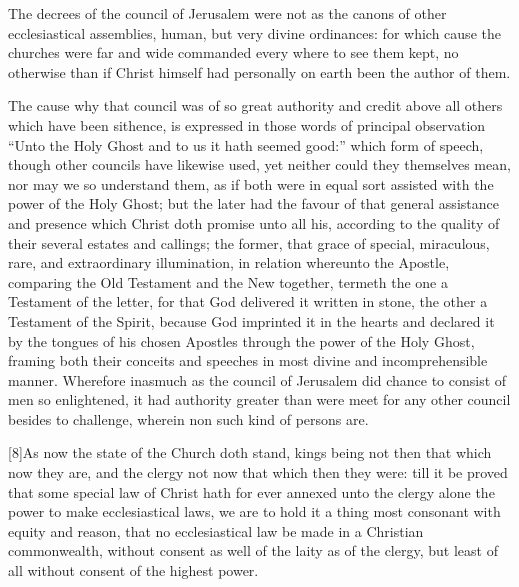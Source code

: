 The decrees of the council of Jerusalem were not as the canons of other ecclesiastical assemblies, human, but very divine ordinances: for which cause the churches were far and wide commanded every where to see them kept, no otherwise than if Christ himself had personally on earth been the author of them.

The cause why that council was of so great authority and credit above all others which have been sithence, is expressed in those words of principal observation “Unto the Holy Ghost and to us it hath seemed good:” which form of speech, though other councils have likewise used, yet neither could they themselves mean, nor may we so understand them, as if both were in equal sort assisted with the power of the Holy Ghost; but the later had the favour of that general assistance and presence which Christ doth promise unto all his, according to the quality of their several estates and callings; the former, that grace of special, miraculous, rare, and extraordinary illumination, in relation whereunto the Apostle, comparing the Old Testament and the New together, termeth the one a Testament of the letter, for that God delivered it written in stone, the other a Testament of the Spirit, because God imprinted it in the hearts and declared it by the tongues of his chosen Apostles through the power of the Holy Ghost, framing both their conceits and speeches in most divine and incomprehensible manner. Wherefore inasmuch as the council  of Jerusalem did chance to consist of men so enlightened, it had authority greater than were meet for any other council besides to challenge, wherein non such kind of persons are.

[8]As now the state of the Church doth stand, kings being not then that which now they are, and the clergy not now that which then they were: till it be proved that some special law of Christ hath for ever annexed unto the clergy alone the power to make ecclesiastical laws, we are to hold it a thing most consonant with equity and reason, that no ecclesiastical law be made in a Christian commonwealth, without consent as well of the laity as of the clergy, but least of all without consent of the highest power.

